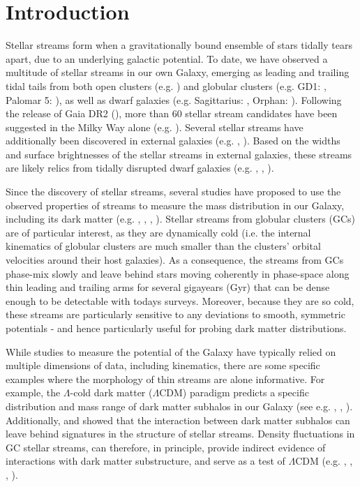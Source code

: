\documentclass[twocolumn]{aastex62}
\begin{document}
\section{Introduction} \label{sec:intro}
Stellar streams form when a gravitationally bound ensemble of stars tidally tears apart, due to an underlying galactic potential. To date, we have observed a multitude of stellar streams in our own Galaxy, emerging as leading and trailing tidal tails from both open clusters (e.g. \citealt{roser19}) and globular clusters (e.g. GD1: \citealt{grillmair06}, Palomar 5: \citealt{oden01}), as well as dwarf galaxies (e.g. Sagittarius: \citealt{ibata01}, Orphan: \citealt{belokurov06}). Following the release of Gaia DR2 (\citealt{gaiadr2}), more than 60 stellar stream candidates have been suggested in the Milky Way alone (e.g. \citealt{ibata19}). 
Several stellar streams have additionally been discovered in external galaxies (e.g. \citealt{ibata00}, \citealt{delgado10}). Based on the widths and surface brightnesses of the stellar streams in external galaxies, these streams are likely relics from tidally disrupted dwarf galaxies (e.g. \citealt{delgado12}, \citealt{rich12}, \citealt{annibali12}).

Since the discovery of stellar streams, several studies have proposed to use the observed properties of streams to measure the mass distribution in our Galaxy, including its dark matter (e.g. \citealt{johnston99}, \citealt{koposov10}, \citealt{law10}, \citealt{bovy16}). Stellar streams from globular clusters (GCs) are of particular interest, as they are dynamically cold (i.e. the internal kinematics of globular clusters are much smaller than the clusters' orbital velocities around their host galaxies). As a consequence, the streams from GCs phase-mix slowly and leave behind stars moving coherently in phase-space along thin leading and trailing arms for several gigayears (Gyr) that can be dense enough to be detectable with todays surveys. %
Moreover, because they are so cold, these streams are particularly sensitive to any deviations to smooth, symmetric potentials - and hence particularly useful for probing dark matter distributions.

While studies to measure the potential of the Galaxy have typically relied on multiple dimensions of data, including kinematics, there are some specific examples where the morphology of thin streams are alone informative. For example, the $\Lambda$-cold dark matter ($\Lambda$CDM) paradigm predicts a specific distribution and mass range of dark matter subhalos in our Galaxy (see e.g. \citealt{diemand08}, \citealt{bovy17}, \citealt{bonaca19}). Additionally, \citet{ibata02} and \citet{johnston02} showed that the interaction between dark matter subhalos can leave behind signatures in the structure of stellar streams. Density fluctuations in GC stellar streams, can therefore, in principle, provide indirect evidence of interactions with dark matter substructure, and serve as a test of $\Lambda$CDM (e.g. \citealt{yoon11}, \citealt{erkal16}, \citealt{bovy17}, \citealt{bonaca19}).
\end{document}

